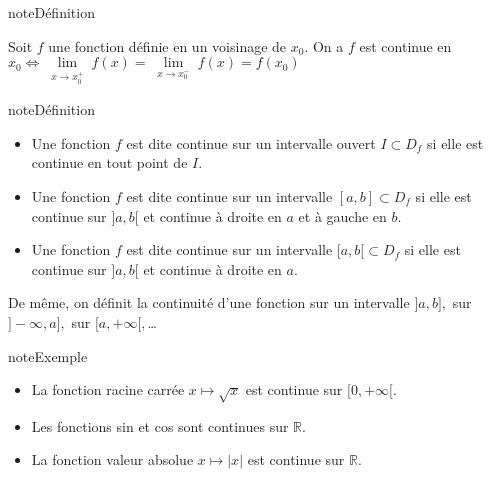 \documentclass[letterpaper,10pt,french]{jupyterBook}
\begin{document}
\begin{sphinxadmonition}{note}{Définition}

\sphinxAtStartPar
Soit \(f\) une fonction définie en un voisinage de \(x_0.\) On a
\(f\) est continue en \(x_0\Leftrightarrow\lim\limits_{\substack{x\rightarrow x_{0}^{+}}}f(x)=\lim\limits_{\substack{x\rightarrow x_{0}^{-}}}f(x)=f(x_0)\)
\end{sphinxadmonition}

\begin{sphinxadmonition}{note}{Définition}
\begin{itemize}
\item {} 
\sphinxAtStartPar
Une fonction \(f\) est dite continue sur un intervalle ouvert \(I\subset D_f\) si elle est continue en tout point de \(I.\)

\item {} 
\sphinxAtStartPar
Une fonction \(f\) est dite continue sur un intervalle \([a,b]\subset D_f\) si elle est continue sur \(]a,b[\) et continue à droite en \(a\) et à gauche en \(b.\)

\item {} 
\sphinxAtStartPar
Une fonction \(f\) est dite continue sur un intervalle \([a,b[\subset D_f\) si elle est continue sur \(]a,b[\) et continue à droite en \(a.\)

\end{itemize}

\sphinxAtStartPar
De même, on définit la continuité d’une fonction sur un intervalle \(]a,b],\) sur \(]-\infty,a],\) sur \([a,+\infty[,\)…
\end{sphinxadmonition}

\begin{sphinxadmonition}{note}{Exemple}
\begin{itemize}
\item {} 
\sphinxAtStartPar
La fonction racine carrée \(x\mapsto \sqrt{x}\) est continue sur \([0,+\infty[.\)

\item {} 
\sphinxAtStartPar
Les fonctions sin et cos sont continues sur \(\mathbb{R}.\)

\item {} 
\sphinxAtStartPar
La fonction valeur absolue \(x\mapsto |x|\) est continue sur \(\mathbb{R}.\)

\end{itemize}
\end{sphinxadmonition}
\end{document}
